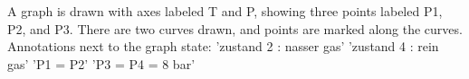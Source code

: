 A graph is drawn with axes labeled T and P, showing three points labeled P1, P2, and P3. There are two curves drawn, and points are marked along the curves. Annotations next to the graph state: 
'zustand 2 : nasser gas' 
'zustand 4 : rein gas' 
'P1 = P2' 
'P3 = P4 = 8 bar'